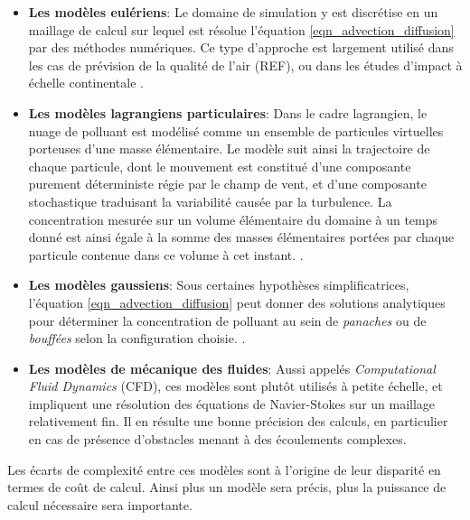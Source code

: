 	\begin{itemize} 
	\item \textbf{Les modèles eulériens}:
	Le domaine de simulation y est discrétise en un maillage de calcul sur lequel est résolue l'équation \eqref{eqn_advection_diffusion} par des méthodes numériques. Ce type d'approche est largement utilisé dans les cas de prévision de la qualité de l'air (REF), ou dans les études d'impact à échelle continentale \cite{Saunier2013} .\\
	
	\item \textbf{Les modèles lagrangiens particulaires}:
	Dans le cadre lagrangien, le nuage de polluant est modélisé comme un ensemble de particules virtuelles porteuses d'une masse élémentaire. Le modèle suit ainsi la trajectoire de chaque particule, dont le mouvement est constitué d'une composante purement déterministe régie par le champ de vent, et d'une composante stochastique traduisant la variabilité causée par la turbulence. La concentration mesurée sur un volume élémentaire du domaine à un temps donné est ainsi égale à la somme des masses élémentaires portées par chaque particule contenue dans ce volume à cet instant. .\\
	
	\item \textbf{Les modèles gaussiens}:
	Sous certaines hypothèses simplificatrices, l'équation \eqref{eqn_advection_diffusion} peut donner des solutions analytiques pour déterminer la concentration de polluant au sein de \textit{panaches} ou de \textit{bouffées} selon la configuration choisie. .
	\item \textbf{Les modèles de mécanique des fluides}:
	Aussi appelés \textit{Computational Fluid Dynamics} (CFD), ces modèles sont plutôt utilisés à petite échelle, et impliquent une résolution des équations de Navier-Stokes sur un maillage relativement fin. Il en résulte une bonne précision des calculs, en particulier en cas de présence d'obstacles menant à des écoulements complexes.\\
	
	\end{itemize}
	
	Les écarts de complexité entre ces modèles sont à l'origine de leur disparité en termes de coût de calcul. Ainsi plus un modèle sera précis, plus la puissance de calcul nécessaire sera importante. 
	
